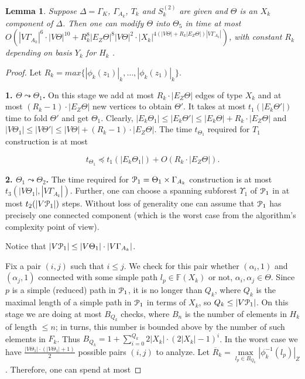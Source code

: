 \documentclass[a4paper,12pt]{article}
\renewcommand{\a}{\alpha }
\newcommand{\G}{\Gamma }
\newcommand{\D}{\Delta }
\newcommand{\T}{\Theta }
\newcommand{\U}{\Upsilon }
\newcommand{\cP}{{\cal{P}}}
\newtheorem{lemma}[theorem]{Lemma}
\numberwithin{equation}{section}
\numberwithin{figure}{section}
\newcommand{\FF}{\ensuremath{\mathbb{F}}}
\begin{document}
\begin{lemma}\label{lem:resolution} Suppose $\D = \G_K$, $\G_{A_k}$, $T_k$ and $S^{(2)}_k$ are given and
$\T$ is an $X_k$ component of $\D$. Then one can modify $\T$ into
$\T_5$ in time at most $O(|V \G_{A_k}|^6 \cdot
|V\T|^{10}+R_k^8|E_Z\T|^8|V\T|^2\cdot |X_k|^{4 (|V \T|+ R_k |E_Z
\T |)|V\G_{A_k}|})$, with constant $R_k$ depending on basis $Y_k$
for $H_k$ .
\end{lemma}

\begin{proof} Let $R_k = max \{ |\phi_k(z_1)|_k, \ldots,
|\phi_k(z_1)|_k\}$.

{\bf 1. $\T \leadsto \T_1$.} On this stage we add at most $R_k
\cdot |E_Z \T |$ edges of type $X_k$ and at most $(R_k-1)\cdot
|E_Z \T |$ new vertices to obtain $\T'$. It takes at most
$t_1(|E_k \T'|)$ time to fold $\T'$ and get $\T_1$. Clearly,
$|E_k\T_1 | \le |E_k\T' | \le |E_k\T | +  R_k \cdot |E_Z \T |$ and
$|V \T_1| \le |V \T' | \le |V \T|+ (R_k-1)\cdot |E_Z \T |$. The
time $t_{\T_1}$ required for $T_1$ construction is at most

\begin{equation}\label{theta1}
t_{\T_1} \preceq t_1(|E_k \T_1|) + O(R_k \cdot |E_Z \T |).
\end{equation}

{\bf 2. $\T_1 \leadsto \T_2$.} The time required for
$\cP_1=\T_1\times \G_{A_k}$ construction is at most $t_3(|V \T_1|,
|V \G_{A_k}|)$. Further, one can choose a spanning subforest
$\U_1$ of $\cP_1$ in at most $t_2(|V\cP_1|)$ steps. Without loss
of generality one can assume that $\cP_1$ has precisely one
connected component (which is the worst case from the algorithm's
complexity point of view).

Notice that $|V\cP_1| \le |V\T_1|\cdot |V \G_{A_k}|$.

Fix a pair $(i, j)$ such that $i \le j$. We check for this pair
whether $(\a_i,1)$ and $(\a_j,1)$ connected with some simple path
$l_p \in \FF(X_k)$  or not, $\a_i, \a_j \in \T$. Since $p$ is a
simple (reduced) path in $\cP_1$, it is no longer than $Q_k$,
where $Q_k$ is the maximal length of a simple path in $\cP_1$ in
terms of $X_k$, so $Q_k \le |V\cP_1|$. On this stage we are doing
at most $B_{Q_k}$ checks, where $B_n$ is the number of elements in
$H_k$ of length $\le n$; in turns, this number is bounded above by
the number of such elements in $F_k$. Thus $B_{Q_k} = 1+
\mathop{\sum}\limits_{i=0}^{Q_k} 2|X_k| \cdot (2|X_k|-1)^{i}$. In
the worst case we have $\frac{|V\T_1|\cdot(|V\T_1|+1)}{2}$
possible pairs $(i,j)$ to analyze. Let
$\overline{R}_k=\mathop{max}\limits_{l_p \in
B_{Q_k}}|\phi^{-1}_k(l_p)|_Z$.
 Therefore, one can spend at
most


\end{proof}
\end{document}
